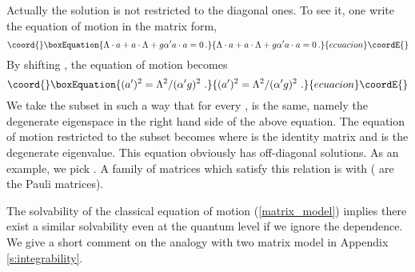 \documentclass[a4paper,aps,preprint,nofootinbib,eqsecnum]{revtex4}
\begin{document}
Actually the solution is not restricted to the diagonal ones. To see it, one
write the equation of motion in the matrix form,
\begin{equation}\coord{}\boxEquation{
\Lambda \cdot a+a\cdot \Lambda +g{\alpha'} a\cdot a=0\,.
}{
\Lambda \cdot a+a\cdot \Lambda +g{\alpha'} a\cdot a=0\,.
}{ecuacion}\coordE{}\end{equation}%
By shifting \coordHE{},
the equation of motion becomes
\begin{equation}\coord{}\boxEquation{
(a^{\prime })^{2}=\Lambda ^{2}/({\alpha'}g)^{2}\,\,.
}{
(a^{\prime })^{2}=\Lambda ^{2}/({\alpha'}g)^{2}\,\,.
}{ecuacion}\coordE{}\end{equation}%
We take the subset \coordHE{} in such a way that for every \coordHE{}, \coordHE{} is the
same, namely the degenerate eigenspace in the right hand side of the above
equation. The equation of motion restricted to the subset \coordHE{} becomes \coordHE{}
where \coordHE{} is the identity matrix and \myHighlight{$\lambda $}\coordHE{} is the degenerate
eigenvalue. This equation obviously has off-diagonal solutions. As an
example, we pick \coordHE{}. A family of matrices which satisfy this relation is \coordHE{} with
\coordHE{}
(\coordHE{} are the Pauli matrices).

The solvability of the classical equation of motion (\ref{matrix_model})
implies there exist a similar solvability even at the quantum level if we
ignore the \coordHE{} dependence. We give a short comment on the analogy with
two matrix model in Appendix \ref{s:integrability}.
\end{document}
